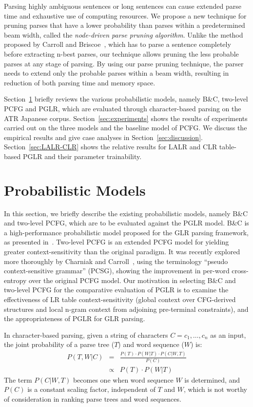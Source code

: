 Parsing highly ambiguous sentences or long sentences can cause
extended parse time and exhaustive use of computing resources. We
propose a new technique for pruning parses that have a lower
probability than parses within a predetermined beam width, called the
{\it node-driven parse pruning algorithm}. Unlike the method proposed
by Carroll and Briscoe~\cite{Carroll:92}, which has to parse a
sentence completely before extracting n-best parses, our technique
allows pruning the less probable parses
at any stage of parsing. By using our parse pruning technique, the
parser needs to extend only the probable parses
within a beam width, resulting in reduction of both parsing time and
memory space.

Section~\ref{sec:model} briefly reviews the various probabilistic
models, namely B\&C, two-level PCFG and PGLR, which are evaluated
through character-based parsing on the ATR Japanese
corpus. Section~\ref{sec:experiments} shows the results of experiments
carried out on the three models and the baseline model of PCFG. We
discuss the empirical results and give case analyses in
Section~\ref{sec:discussion}. Section~\ref{sec:LALR-CLR} shows the
relative results for LALR and CLR table-based PGLR and their parameter
trainability. 

\section{Probabilistic Models}
\label{sec:model}
In this section, we briefly describe the existing probabilistic
models, namely B\&C and two-level PCFG, which are to be evaluated
against the PGLR model. B\&C is a high-performance probabilistic model
proposed for the GLR parsing framework, as presented
in~\cite{Briscoe:93}. Two-level PCFG is an extended PCFG model for
yielding greater context-sensitivity than the original paradigm. It
was recently explored more thoroughly by Charniak and
Carroll~\cite{Charniak:94}, using the terminology ``pseudo
context-sensitive grammar'' (PCSG), showing the improvement in
per-word cross-entropy over the original PCFG model. Our motivation in
selecting B\&C and two-level PCFG for the comparative evaluation of
PGLR is to examine the effectiveness of LR table context-sensitivity
(global context over CFG-derived structures and local n-gram context
from adjoining pre-terminal constraints), and the appropriateness of
PGLR for GLR parsing.

In character-based parsing, given a string of characters $C =
{c_1,\ldots,c_n}$ as an input, the joint probability of a parse tree
($T$) and word sequence ($W$) is:
\begin{eqnarray}
  \label{eq:tree-prob}
  P(T,W|C) &=& \frac{P(T) \cdot P(W|T) \cdot P(C|W,T)}{P(C)} \\
           &\propto& P(T) \cdot P(W|T)
\end{eqnarray}
The term $P(C|W,T)$ becomes one when word sequence $W$ is determined,
and $P(C)$ is a constant scaling factor, independent of $T$ and $W$,
which is not worthy of consideration in ranking parse trees and word
sequences.

